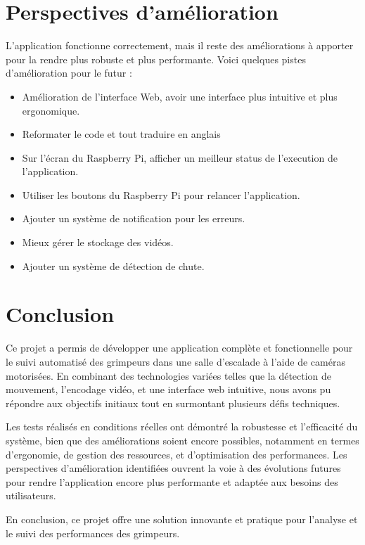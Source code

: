 \documentclass[a4paper, 11pt, french]{article}
\newcounter{obj}
\begin{document}
\section{Perspectives d'amélioration}
L'application fonctionne correctement, mais il reste des améliorations à apporter pour la rendre plus robuste et plus performante. Voici quelques pistes d'amélioration pour le futur :
\begin{itemize}
  \item Amélioration de l'interface Web, avoir une interface plus intuitive et plus ergonomique.
  \item Reformater le code et tout traduire en anglais
  \item Sur l'écran du Raspberry Pi, afficher un meilleur status de l'execution de l'application.
  \item Utiliser les boutons du Raspberry Pi pour relancer l'application.
  \item Ajouter un système de notification pour les erreurs.
  \item Mieux gérer le stockage des vidéos.
  \item Ajouter un système de détection de chute.
\end{itemize}




\section{Conclusion}
Ce projet a permis de développer une application complète et fonctionnelle pour le suivi automatisé des grimpeurs dans une salle d'escalade à l'aide de caméras motorisées. En combinant des technologies variées telles que la détection de mouvement, l'encodage vidéo, et une interface web intuitive, nous avons pu répondre aux objectifs initiaux tout en surmontant plusieurs défis techniques.

Les tests réalisés en conditions réelles ont démontré la robustesse et l'efficacité du système, bien que des améliorations soient encore possibles, notamment en termes d'ergonomie, de gestion des ressources, et d'optimisation des performances. Les perspectives d'amélioration identifiées ouvrent la voie à des évolutions futures pour rendre l'application encore plus performante et adaptée aux besoins des utilisateurs.

En conclusion, ce projet offre une solution innovante et pratique pour l'analyse et le suivi des performances des grimpeurs.
\end{document}

